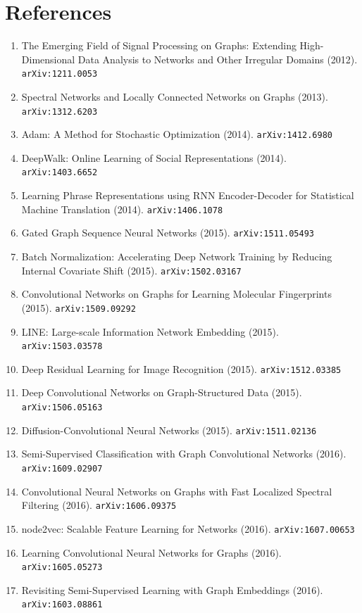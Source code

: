 \documentclass[11pt]{article}
\begin{document}
\section*{References}
\begin{enumerate}\small
  \item The Emerging Field of Signal Processing on Graphs: Extending
  High-Dimensional Data Analysis to Networks and Other Irregular Domains (2012). \texttt{arXiv:1211.0053}
  \item Spectral Networks and Locally Connected Networks on Graphs (2013). \texttt{arXiv:1312.6203}
  \item Adam: A Method for Stochastic Optimization (2014). \texttt{arXiv:1412.6980}
  \item DeepWalk: Online Learning of Social Representations (2014). \texttt{arXiv:1403.6652}
  \item Learning Phrase Representations using RNN Encoder-Decoder for
  Statistical Machine Translation (2014). \texttt{arXiv:1406.1078}
  \item Gated Graph Sequence Neural Networks (2015). \texttt{arXiv:1511.05493}
  \item Batch Normalization: Accelerating Deep Network Training by Reducing
  Internal Covariate Shift (2015). \texttt{arXiv:1502.03167}
  \item Convolutional Networks on Graphs for Learning Molecular Fingerprints (2015). \texttt{arXiv:1509.09292}
  \item LINE: Large-scale Information Network Embedding (2015). \texttt{arXiv:1503.03578}
  \item Deep Residual Learning for Image Recognition (2015). \texttt{arXiv:1512.03385}
  \item Deep Convolutional Networks on Graph-Structured Data (2015). \texttt{arXiv:1506.05163}
  \item Diffusion-Convolutional Neural Networks (2015). \texttt{arXiv:1511.02136}
  \item Semi-Supervised Classification with Graph Convolutional Networks (2016). \texttt{arXiv:1609.02907}
  \item Convolutional Neural Networks on Graphs with Fast Localized Spectral
  Filtering (2016). \texttt{arXiv:1606.09375}
  \item node2vec: Scalable Feature Learning for Networks (2016). \texttt{arXiv:1607.00653}
  \item Learning Convolutional Neural Networks for Graphs (2016). \texttt{arXiv:1605.05273}
  \item Revisiting Semi-Supervised Learning with Graph Embeddings (2016). \texttt{arXiv:1603.08861}

\end{enumerate}
\end{document}
